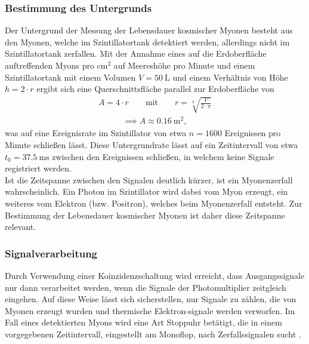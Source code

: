 \subsubsection{Bestimmung des Untergrunds}
\noindent Der Untergrund der Messung der Lebensdauer kosmischer Myonen besteht
aus den Myonen, welche im Szintillatortank detektiert werden, allerdings nicht
im Szintillatortank zerfallen. Mit der Annahme eines auf die Erdoberfläche
auftreffenden Myons pro $\si{\centi\meter^2}$ auf Meereshöhe pro Minute
\cite{grupen} und einem Szintillatortank mit einem Volumen $V = \SI{50}{\liter}$
und einem Verhältnis von Höhe  $h = 2 \cdot r$ \cite{anleitung} ergibt sich eine
Querschnittsfläche parallel zur Erdoberfläche von \\
\begin{align}
  A = 4 \cdot r \qquad \text{mit} \qquad r = \sqrt[3]{\frac{V}{2 \cdot \pi}}
  \label{eqn:03}
\end{align}
\begin{align*}
  \implies A \approx \SI{0.16}{\meter^2},
\end{align*}
\noindent was auf eine Ereignisrate im Szintillator von etwa $n = \num{1600}$
Ereignissen pro Minute schließen lässt. Diese Untergrundrate lässt auf ein
Zeitintervall von etwa $t_0 = \SI{37.5}{\milli\second}$ zwischen den Ereignissen
schließen, in welchem keine Signale registriert werden. \\
\newline
\noindent Ist die Zeitspanne zwischen den Signalen deutlich kürzer, ist ein
Myonenzerfall wahrscheinlich. Ein Photon im Szintillator wird dabei vom Myon
erzeugt, ein weiteres vom Elektron (bzw. Positron), welches beim Myonenzerfall
entsteht. Zur Bestimmung der Lebensdauer kosmischer Myonen ist daher diese
Zeitspanne relevant. \\
\subsubsection{Signalverarbeitung}
\noindent Durch Verwendung einer Koinzidenzschaltung wird erreicht, dass
Ausgangssignale nur dann verarbeitet werden, wenn die Signale der Photomultiplier
zeitgleich eingehen. Auf diese Weise lässt sich sicherstellen, nur Signale zu zählen, die von Myonen erzeugt wurden und thermische Elektron-signale werden verworfen. Im Fall eines detektierten Myons wird
eine Art Stoppuhr betätigt, die in einem vorgegebenen Zeitintervall, eingestellt
am Monoflop, nach Zerfallssignalen sucht \cite{anleitung}. \\
